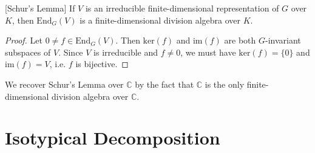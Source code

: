 \begin{thm}\label{schur-lemma}[Schur's Lemma] If $V$ is an irreducible finite-dimensional representation of $G$ over $K$, then $\text{End}_G(V)$ is a finite-dimensional division algebra over $K$.
\end{thm}
\begin{proof}
Let $0 \neq f \in \text{End}_G(V)$.  Then $\text{ker}(f)$ and $\text{im}(f)$ are both $G$-invariant subspaces of $V$.  Since $V$ is irreducible and $f \neq 0$, we must have $\text{ker}(f) = \{ 0\}$ and $\text{im}(f) = V$, i.e. $f$ is bijective.  
\end{proof}
\begin{note}
We recover Schur's Lemma over $\mathbb{C}$ by the fact that $\mathbb{C}$ is the only finite-dimensional division algebra over $\mathbb{C}$.
\end{note}


\section{Isotypical Decomposition}

